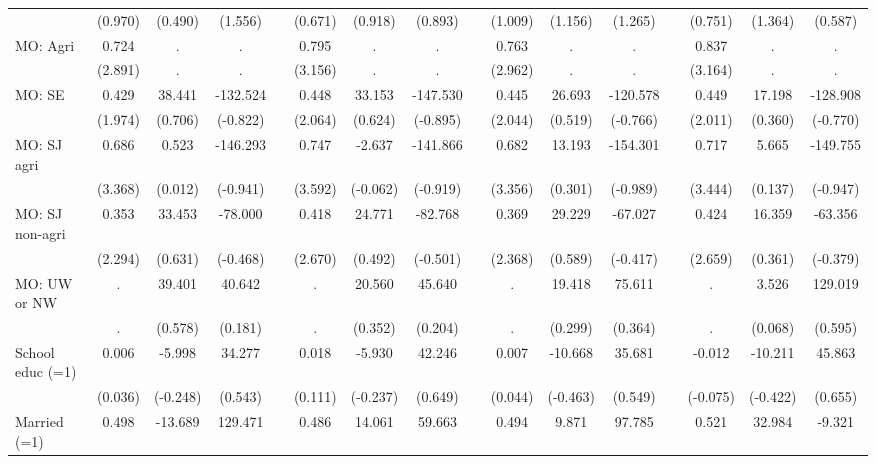 {\begin{longtable}{@{\extracolsep{\fill}}lccccccccccccccc}
          & (0.970) & (0.490) & (1.556) &       & (0.671) & (0.918) & (0.893) &       & (1.009) & (1.156) & (1.265) &       & (0.751) & (1.364) & (0.587) \\
    MO: Agri & 0.724 & .     & .     &       & 0.795 & .     & .     &       & 0.763 & .     & .     &       & 0.837 & .     & . \\
          & (2.891) & .     & .     &       & (3.156) & .     & .     &       & (2.962) & .     & .     &       & (3.164) & .     & . \\
    MO: SE & 0.429 & 38.441 & -132.524 &       & 0.448 & 33.153 & -147.530 &       & 0.445 & 26.693 & -120.578 &       & 0.449 & 17.198 & -128.908 \\
          & (1.974) & (0.706) & (-0.822) &       & (2.064) & (0.624) & (-0.895) &       & (2.044) & (0.519) & (-0.766) &       & (2.011) & (0.360) & (-0.770) \\
    MO: SJ agri & 0.686 & 0.523 & -146.293 &       & 0.747 & -2.637 & -141.866 &       & 0.682 & 13.193 & -154.301 &       & 0.717 & 5.665 & -149.755 \\
          & (3.368) & (0.012) & (-0.941) &       & (3.592) & (-0.062) & (-0.919) &       & (3.356) & (0.301) & (-0.989) &       & (3.444) & (0.137) & (-0.947) \\
    MO: SJ non-agri & 0.353 & 33.453 & -78.000 &       & 0.418 & 24.771 & -82.768 &       & 0.369 & 29.229 & -67.027 &       & 0.424 & 16.359 & -63.356 \\
          & (2.294) & (0.631) & (-0.468) &       & (2.670) & (0.492) & (-0.501) &       & (2.368) & (0.589) & (-0.417) &       & (2.659) & (0.361) & (-0.379) \\
    MO: UW or NW & .     & 39.401 & 40.642 &       & .     & 20.560 & 45.640 &       & .     & 19.418 & 75.611 &       & .     & 3.526 & 129.019 \\
          & .     & (0.578) & (0.181) &       & .     & (0.352) & (0.204) &       & .     & (0.299) & (0.364) &       & .     & (0.068) & (0.595) \\
    School educ (=1) & 0.006 & -5.998 & 34.277 &       & 0.018 & -5.930 & 42.246 &       & 0.007 & -10.668 & 35.681 &       & -0.012 & -10.211 & 45.863 \\
          & (0.036) & (-0.248) & (0.543) &       & (0.111) & (-0.237) & (0.649) &       & (0.044) & (-0.463) & (0.549) &       & (-0.075) & (-0.422) & (0.655) \\
    Married (=1) & 0.498 & -13.689 & 129.471 &       & 0.486 & 14.061 & 59.663 &       & 0.494 & 9.871 & 97.785 &       & 0.521 & 32.984 & -9.321 \\

\end{longtable}}
